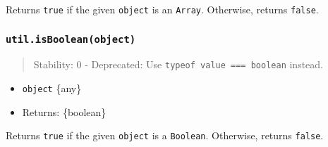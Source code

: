 Returns \texttt{true} if the given \texttt{object} is an \texttt{Array}.
Otherwise, returns \texttt{false}.

\begin{Shaded}
\begin{Highlighting}[]
\OperatorTok{=} \NormalTok{(}\NormalTok{)}\OperatorTok{;}

\NormalTok{([])}\OperatorTok{;}
\NormalTok{(} \NormalTok{())}\OperatorTok{;}
\NormalTok{(\{\})}\OperatorTok{;}
\end{Highlighting}
\end{Shaded}

\subsubsection{\texorpdfstring{\texttt{util.isBoolean(object)}}{util.isBoolean(object)}}\label{util.isbooleanobject}

\begin{quote}
Stability: 0 - Deprecated: Use
\texttt{typeof\ value\ ===\ \textquotesingle{}boolean\textquotesingle{}}
instead.
\end{quote}

\begin{itemize}
\tightlist
\item
  \texttt{object} \{any\}
\item
  Returns: \{boolean\}
\end{itemize}

Returns \texttt{true} if the given \texttt{object} is a
\texttt{Boolean}. Otherwise, returns \texttt{false}.

\begin{Shaded}
\begin{Highlighting}[]
\OperatorTok{=} \NormalTok{(}\NormalTok{)}\OperatorTok{;}

\NormalTok{(}\NormalTok{)}\OperatorTok{;}
\NormalTok{(}\NormalTok{)}\OperatorTok{;}
\NormalTok{(}\NormalTok{)}\OperatorTok{;}
\end{Highlighting}
\end{Shaded}

